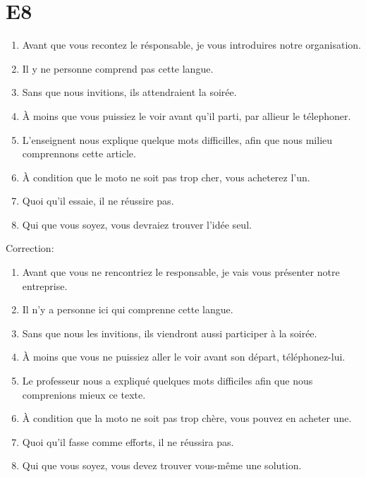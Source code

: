 \documentclass{book}
\begin{document}
    \section{E8}
        \begin{enumerate}
            \item Avant que vous recontez le résponsable, je vous introduires notre organisation.
            \item Il y ne personne comprend pas cette langue.
            \item Sans que nous invitions, ils attendraient la soirée.
            \item À moins que vous puissiez le voir avant qu'il parti, par allieur le télephoner.
            \item L'enseignent nous explique quelque mots difficilles, afin que nous milieu comprennons cette article.
            \item À condition que le moto ne soit pas trop cher, vous acheterez l'un.
            \item Quoi qu'il essaie, il ne réussire pas.
            \item Qui que vous soyez, vous devraiez trouver l'idée seul.
        \end{enumerate}
        Correction:
        \begin{enumerate}
            \item Avant que vous ne rencontriez le responsable, je vais vous présenter notre entreprise.
            \item Il n'y a personne ici qui comprenne cette langue.
            \item Sans que nous les invitions, ils viendront aussi participer à la soirée.
            \item À moins que vous ne puissiez aller le voir avant son départ, téléphonez-lui.
            \item Le professeur nous a expliqué quelques mots difficiles afin que nous comprenions mieux ce texte.
            \item À condition que la moto ne soit pas trop chère, vous pouvez en acheter une.
            \item Quoi qu'il fasse comme efforts, il ne réussira pas.
            \item Qui que vous soyez, vous devez trouver vous-même une solution.
        \end{enumerate}
\end{document}
